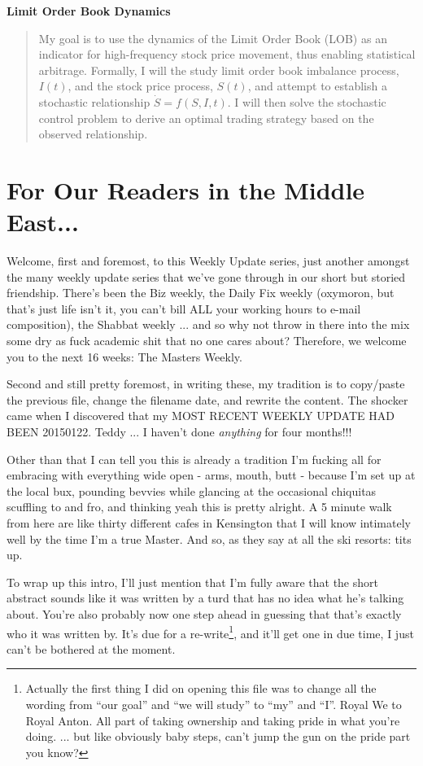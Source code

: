 \documentclass[12pt]{article}
\begin{document}
\mymascheader
\pagestyle{plain}
{\begin{center} {\large {\bf Limit Order Book Dynamics}} \end{center}}
\bigskip


\begin{quote}
My goal is to use the dynamics of the Limit Order Book (LOB) as an indicator for
high-frequency stock price movement, thus enabling statistical arbitrage. Formally, I will the study limit order book imbalance process, $I(t)$, and the stock price process, $S(t)$, and attempt to establish a stochastic relationship $\dot{S} = f(S,I,t)$. I will then solve the stochastic control problem to derive an optimal trading strategy based on the observed relationship.
\end{quote}

\section*{For Our Readers in the Middle East...}
Welcome, first and foremost, to this Weekly Update series, just another amongst the many weekly update series that we've gone through in our short but storied friendship. There's been the Biz weekly, the Daily Fix weekly (oxymoron, but that's just life isn't it, you can't bill ALL your working hours to e-mail composition), the Shabbat weekly ... and so why not throw in there into the mix some dry as fuck academic shit that no one cares about? Therefore, we welcome you to the next 16 weeks: The Masters Weekly. 

Second and still pretty foremost, in writing these, my tradition is to copy/paste the previous file, change the filename date, and rewrite the content. The shocker came when I discovered that my MOST RECENT WEEKLY UPDATE HAD BEEN 20150122. Teddy ... I haven't done \textit{anything} for four months!!!

Other than that I can tell you this is already a tradition I'm fucking all for embracing with everything wide open - arms, mouth, butt - because I'm set up at the local bux, pounding bevvies while glancing at the occasional chiquitas scuffling to and fro, and thinking yeah this is pretty alright. A 5 minute walk from here are like thirty different cafes in Kensington that I will know intimately well by the time I'm a true Master. And so, as they say at all the ski resorts: tits up.

To wrap up this intro, I'll just mention that I'm fully aware that the short abstract sounds like it was written by a turd that has no idea what he's talking about. You're also probably now one step ahead in guessing that that's exactly who it was written by. It's due for a re-write\footnote{Actually the first thing I did on opening this file was to change all the wording from ``our goal'' and ``we will study'' to ``my'' and ``I''. Royal We to Royal Anton. All part of taking ownership and taking pride in what you're doing. ... but like obviously baby steps, can't jump the gun on the pride part you know?}, and it'll get one in due time, I just can't be bothered at the moment. 
\end{document}
